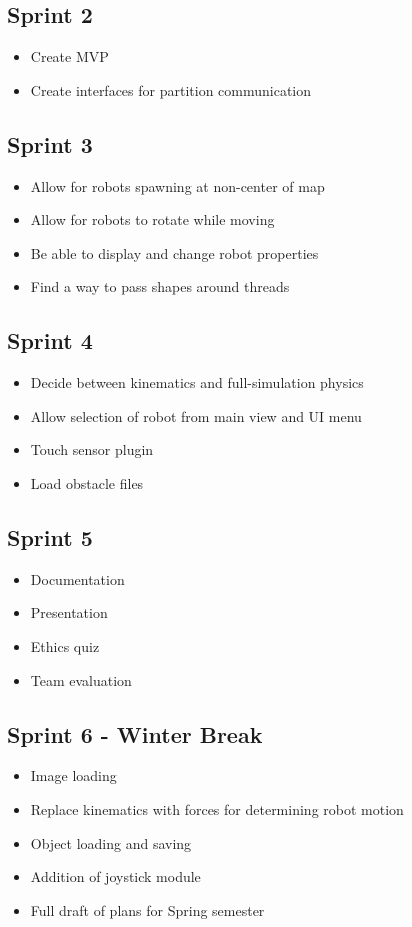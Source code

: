 \subsection{Sprint 2}
\begin{itemize}
	\item Create MVP
	\item Create interfaces for partition communication 
\end{itemize}

\subsection{Sprint 3}
\begin{itemize}
	\item Allow for robots spawning at non-center of map
	\item Allow for robots to rotate while moving
 	\item Be able to display and change robot properties
 	\item Find a way to pass shapes around threads
\end{itemize}

\subsection{Sprint 4}
\begin{itemize}
	\item Decide between kinematics and full-simulation physics
	\item Allow selection of robot from main view and UI menu
	\item Touch sensor plugin
 	\item Load obstacle files
\end{itemize}

\subsection{Sprint 5}
\begin{itemize}
	\item Documentation
	\item Presentation
 	\item Ethics quiz
 	\item Team evaluation
\end{itemize}

\subsection{Sprint 6 - Winter Break}
\begin{itemize}
	\item Image loading
	\item Replace kinematics with forces for determining robot motion
 	\item Object loading and saving
 	\item Addition of joystick module
 	\item Full draft of plans for Spring semester
\end{itemize}

